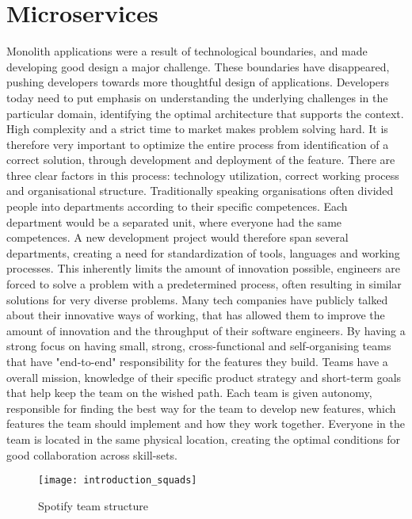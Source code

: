 \section{Microservices}
Monolith applications were a result of technological boundaries, and made developing good design a major challenge. These boundaries have disappeared, pushing developers towards more thoughtful design of applications. Developers today need to put emphasis on understanding the underlying challenges in the particular domain, identifying the optimal architecture that supports the context\cite{evans2016tackling}. High complexity and a strict time to market makes problem solving hard. It is therefore very important to optimize the entire process from identification of a correct solution, through development and deployment of the feature. There are three clear factors in this process: technology utilization, correct working process and organisational structure\cite{george2016it}. Traditionally speaking organisations often divided people into departments according to their specific competences. Each department would be a separated unit, where everyone had the same competences. A new development project would therefore span several departments, creating a need for standardization of tools, languages and working processes. This inherently limits the amount of innovation possible, engineers are forced to solve a problem with a predetermined process, often resulting in similar solutions for very diverse problems\cite{george2016it}. 
Many tech companies have publicly talked about their innovative ways of working, that has allowed them to improve the amount of innovation and the throughput of their software engineers\cite{kniberg2014spotify}. By having a strong focus on having small, strong, cross-functional and self-organising teams that have "end-to-end" responsibility for the features they build. Teams have a overall mission, knowledge of their specific product strategy and short-term goals that help keep the team on the wished path. Each team is given autonomy, responsible for finding the best way for the team to develop new features, which features the team should implement and how they work together. Everyone in the team is located in the same physical location, creating the optimal conditions for good collaboration across skill-sets\cite{kniberg2014spotify}.

\begin{figure}[!htb]
  \texttt{[image: introduction\_squads]}  
  \caption{Spotify team structure}
  \label{fig:introduction_squads}
\end{figure}

